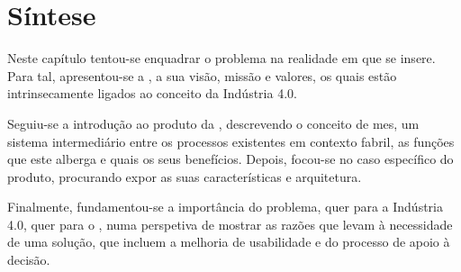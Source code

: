 \section{Síntese}
\label{sec:chap02_chaptersummary}
Neste capítulo tentou-se enquadrar o problema na realidade em que se insere. Para tal, apresentou-se a {\companyname}, a sua visão, missão e valores, os quais estão intrinsecamente ligados ao conceito da Indústria 4.0. 

Seguiu-se a introdução ao produto da {\companyname}, descrevendo o conceito de \gls{mes}, um sistema intermediário entre os processos existentes em contexto fabril, as funções que este alberga e quais os seus benefícios. Depois, focou-se no caso específico do produto, procurando expor as suas características e arquitetura.

Finalmente, fundamentou-se a importância do problema, quer para a Indústria 4.0, quer para o {\productname}, numa perspetiva de mostrar as razões que levam à necessidade de uma solução, que incluem a melhoria de usabilidade e do processo de apoio à decisão.